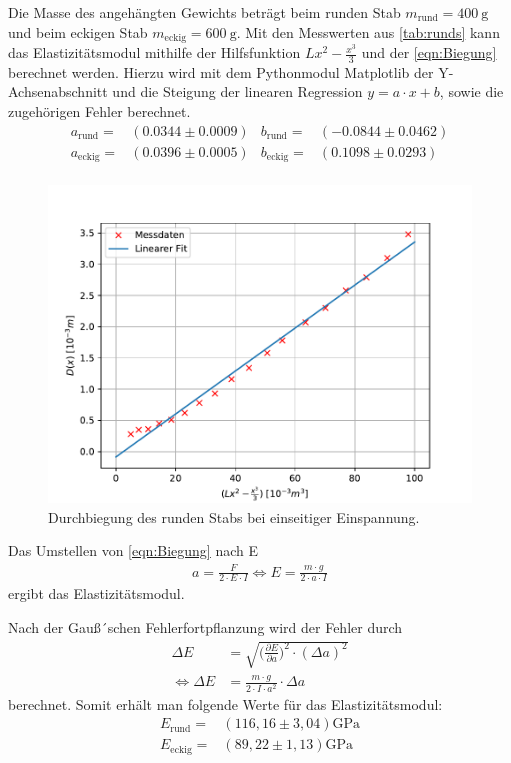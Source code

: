 \bigskip
\noindent Die Masse des angehängten Gewichts beträgt beim runden Stab $m_{\text{rund}}=\qty{400}{\g}$ und beim eckigen Stab $m_{\text{eckig}}=\qty{600}{\g}$. Mit den Messwerten aus \autoref{tab:runds}
kann das Elastizitätsmodul mithilfe der Hilfsfunktion $Lx^2-\frac{x^3}{3}$ und der \autoref{eqn:Biegung} berechnet werden.
Hierzu wird mit dem Pythonmodul Matplotlib \cite{matplotlib} der Y-Achsenabschnitt und die Steigung der linearen Regression $y = a \cdot x + b$, 
sowie die zugehörigen Fehler berechnet.\\
\begin{align*}
  a_{\text{rund}} =&(0.0344 ± 0.0009) & b_{\text{rund}}=& (-0.0844 ± 0.0462)\\
  a_{\text{eckig}} =&(0.0396 ± 0.0005) & b_{\text{eckig}}=& (0.1098 ± 0.0293)\\
 \end{align*}
\begin{figure}[!htb]
  \centering
  \includegraphics[scale=0.75]{content/plots/runde.pdf}
  \caption{Durchbiegung des runden Stabs bei einseitiger Einspannung.}
  \label{fig:LinRegrunde}
\end{figure}
Das Umstellen von \autoref{eqn:Biegung} nach E 
\begin{align}
    a = \frac{F}{2 \cdot E \cdot I} \iff E =\frac{m \cdot g}{2 \cdot a \cdot I}\label{eqn:Elamodul.1}
\end{align}
ergibt das Elastizitätsmodul.

Nach der Gauß´schen Fehlerfortpflanzung wird der Fehler durch
\begin{equation*}
  \begin{aligned}
  \Delta E &= \sqrt{\biggl(\frac{\partial E}{\partial a}\biggr)^2\cdot (\Delta a)^2} \\
  \iff \Delta E &= \frac{m\cdot g}{2\cdot I \cdot a^2} \cdot \Delta a
  \label{eqn:e-fehler-ein}
  \end{aligned}
  \end{equation*}
berechnet.
Somit erhält man folgende Werte für das Elastizitätsmodul:
\begin{align*}
  E_{\text{rund}}=&(116,16\pm3,04)\si{\giga\pascal}\\
  E_{\text{eckig}}=&(89,22\pm1,13)\si{\giga\pascal}\\
  \label{eqn:Eein} 
\end{align*}

